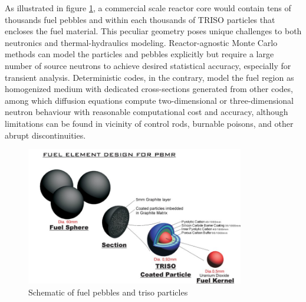 \documentclass{elsarticle}
\begin{document}
As illustrated in figure \ref{fig:triso}, a commercial scale reactor core would contain tens of thousands fuel pebbles and within each thousands of TRISO particles that encloses the fuel material. This peculiar geometry poses unique challenges to both neutronics and thermal-hydraulics modeling. Reactor-agnostic Monte Carlo methods can model the particles and pebbles explicitly but require a large number of source neutrons to achieve desired statistical accuracy, especially for transient analysis. Deterministic codes, in the contrary, model the fuel region as homogenized medium with dedicated cross-sections generated from other codes, among which diffusion equations compute two-dimensional or three-dimensional neutron behaviour with reasonable computational cost and accuracy, although limitations can be found in vicinity of control rods, burnable poisons, and other abrupt discontinuities.

\begin{figure}
  \centering
  \includegraphics[width=0.85\textwidth]{./images/design/TMSR_fuel.jpg}
  \caption{Schematic of fuel pebbles and triso particles}
  \label{fig:triso}
\end{figure}
\end{document}

